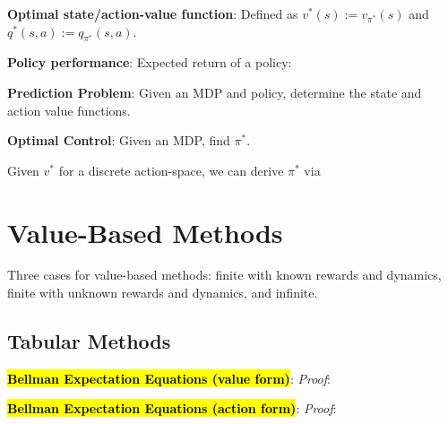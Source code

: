 \documentclass{article}
\begin{document}
  \textbf{Optimal state/action-value function}: Defined as $v^*(s):=v_{\pi^*}(s)$ and $q^*(s,a):=q_{\pi^*}(s,a)$. 

  \textbf{Policy performance}: Expected return of a policy:

  \textbf{Prediction Problem}: Given an MDP and policy, determine the state and action value functions. 

  \textbf{Optimal Control}: Given an MDP, find $\pi^*$.

  Given $v^*$ for a discrete action-space, we can derive $\pi^*$ via

\section{Value-Based Methods}

  Three cases for value-based methods: finite with known rewards and dynamics, finite with unknown rewards and dynamics, and infinite. 

\subsection{Tabular Methods}

  \hl{\textbf{Bellman Expectation Equations (value form)}}: 
  \textit{Proof}:

  \hl{\textbf{Bellman Expectation Equations (action form)}}:
  \textit{Proof}:
\end{document}
